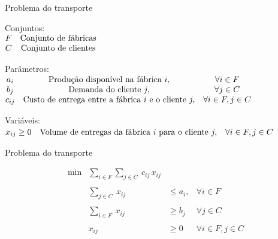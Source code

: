 \documentclass[compress,mathserif]{beamer}
\begin{document}
\begin{frame}{Problema do transporte}

Conjuntos: \\
\vspace{0.2cm}
$\begin{matrix}
F & \textnormal{Conjunto de fábricas} \\
C & \textnormal{Conjunto de clientes}
\end{matrix} 
$

\vspace{1cm}

Parâmetros: \\
\vspace{0.2cm}
$\begin{matrix}
a_{i} & \textnormal{Produção disponível na fábrica } i, & \forall i \in F\\
b_j & \textnormal{Demanda do cliente } j, & \forall j \in C \\
c_{ij} & \textnormal{Custo de entrega entre a fábrica } i \textnormal{ e o cliente } j, & \forall i \in F, j \in C
\end{matrix}
$

\vspace{1cm}

Variáveis: \\
\vspace{0.2cm}
$\begin{matrix}
x_{ij} \geq 0 & \textnormal{Volume de entregas da fábrica } i \textnormal{ para o cliente } j, & \forall i \in F, j \in C
\end{matrix}
$

\end{frame}


\begin{frame}{Problema do transporte}

$$\begin{matrix}
        \min & \sum_{i \in F} \sum_{j \in C}~c_{ij}\,x_{ij}\\  \\
             & \sum_{j \in C}~x_{ij} & \leq a_i, & \forall i \in F \\ \\
             & \sum_{i \in F}~x_{ij} & \geq b_j & \forall j \in C \\ \\
             & x_{ij} & \geq 0 & \forall i \in F, j \in C
        \end{matrix}    
$$

\end{frame}
\end{document}

